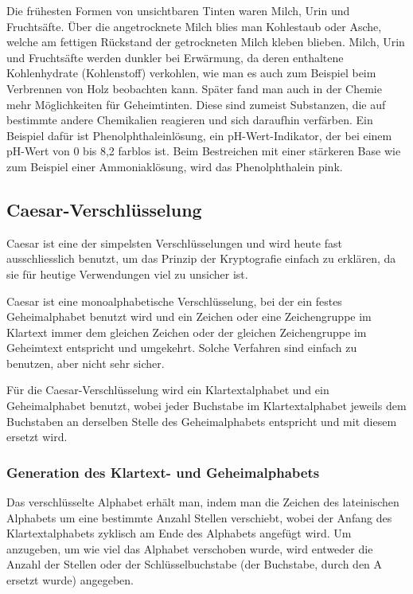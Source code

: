 Die frühesten Formen von unsichtbaren Tinten waren Milch, Urin und Fruchtsäfte. Über die angetrocknete Milch blies man Kohlestaub oder Asche, welche am fettigen Rückstand der getrockneten Milch kleben blieben. Milch, Urin und Fruchtsäfte werden dunkler bei Erwärmung, da deren enthaltene Kohlenhydrate (Kohlenstoff) verkohlen, wie man es auch zum Beispiel beim Verbrennen von Holz beobachten kann. Später fand man auch in der Chemie mehr Möglichkeiten für Geheimtinten. Diese sind zumeist Substanzen, die auf bestimmte andere Chemikalien reagieren und sich daraufhin verfärben. Ein Beispiel dafür ist Phenolphthaleinlösung, ein pH-Wert-Indikator, der bei einem pH-Wert von 0 bis 8,2 farblos ist. Beim Bestreichen mit einer stärkeren Base wie zum Beispiel einer Ammoniaklösung, wird das Phenolphthalein pink.


\newpage %
\subsection {Caesar-Verschlüsselung}
\label{sec:caesar-verschluesselung}

Caesar ist eine der simpelsten Verschlüsselungen und wird heute fast ausschliesslich benutzt, um das Prinzip der Kryptografie einfach zu erklären, da sie für heutige Verwendungen viel zu unsicher ist.

Caesar ist eine monoalphabetische Verschlüsselung, bei der ein festes Geheimalphabet benutzt wird und ein Zeichen oder eine Zeichengruppe im Klartext immer dem gleichen Zeichen oder der gleichen Zeichengruppe im Geheimtext entspricht und umgekehrt. Solche Verfahren sind einfach zu benutzen, aber nicht sehr sicher.

Für die Caesar-Verschlüsselung wird ein Klartextalphabet und ein Geheimalphabet benutzt, wobei jeder Buchstabe im Klartextalphabet jeweils dem Buchstaben an derselben Stelle des Geheimalphabets entspricht und mit diesem ersetzt wird.

\subsubsection{Generation des Klartext- und Geheimalphabets}
\label{sec:c-generation}
Das verschlüsselte Alphabet erhält man, indem man die Zeichen des lateinischen Alphabets um eine bestimmte Anzahl Stellen verschiebt, wobei der Anfang des Klartextalphabets zyklisch am Ende des Alphabets angefügt wird. Um anzugeben, um wie viel das Alphabet verschoben wurde, wird entweder die Anzahl der Stellen oder der Schlüsselbuchstabe (der Buchstabe, durch den A ersetzt wurde) angegeben.

